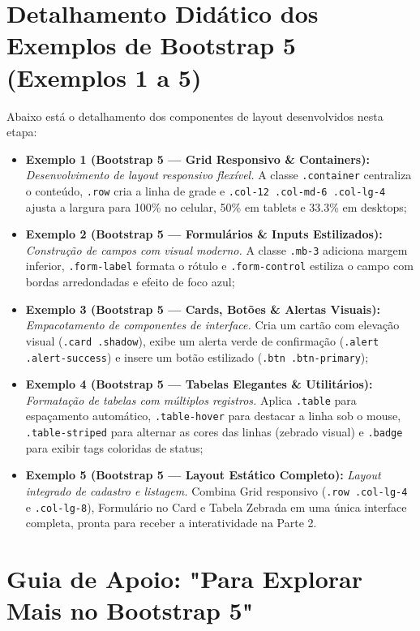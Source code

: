 \section{Detalhamento Didático dos Exemplos de Bootstrap 5 (Exemplos 1 a 5)}\label{sec:m2a}

Abaixo está o detalhamento dos componentes de layout desenvolvidos nesta etapa:

\begin{itemize}
\item \textbf{Exemplo 1 (Bootstrap 5 — Grid Responsivo \& Containers):} \textit{Desenvolvimento de layout responsivo flexível.} A classe \texttt{.container} centraliza o conteúdo, \texttt{.row} cria a linha de grade e \texttt{.col-12 .col-md-6 .col-lg-4} ajusta a largura para 100\% no celular, 50\% em tablets e 33.3\% em desktops;
\item \textbf{Exemplo 2 (Bootstrap 5 — Formulários \& Inputs Estilizados):} \textit{Construção de campos com visual moderno.} A classe \texttt{.mb-3} adiciona margem inferior, \texttt{.form-label} formata o rótulo e \texttt{.form-control} estiliza o campo com bordas arredondadas e efeito de foco azul;
\item \textbf{Exemplo 3 (Bootstrap 5 — Cards, Botões \& Alertas Visuais):} \textit{Empacotamento de componentes de interface.} Cria um cartão com elevação visual (\texttt{.card .shadow}), exibe um alerta verde de confirmação (\texttt{.alert .alert-success}) e insere um botão estilizado (\texttt{.btn .btn-primary});
\item \textbf{Exemplo 4 (Bootstrap 5 — Tabelas Elegantes \& Utilitários):} \textit{Formatação de tabelas com múltiplos registros.} Aplica \texttt{.table} para espaçamento automático, \texttt{.table-hover} para destacar a linha sob o mouse, \texttt{.table-striped} para alternar as cores das linhas (zebrado visual) e \texttt{.badge} para exibir tags coloridas de status;
\item \textbf{Exemplo 5 (Bootstrap 5 — Layout Estático Completo):} \textit{Layout integrado de cadastro e listagem.} Combina Grid responsivo (\texttt{.row .col-lg-4} e \texttt{.col-lg-8}), Formulário no Card e Tabela Zebrada em uma única interface completa, pronta para receber a interatividade na Parte 2.
\end{itemize}


\section{Guia de Apoio: "Para Explorar Mais no Bootstrap 5"}\label{sec:m3a}


